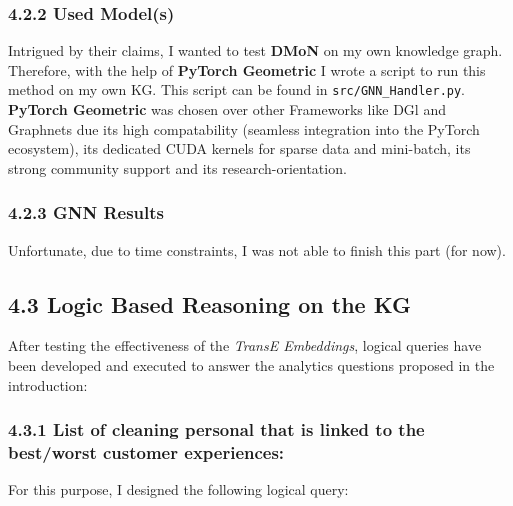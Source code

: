 \documentclass[
]{article}
\begin{document}
\subsubsection{4.2.2 Used Model(s)}\label{used-models-1}

Intrigued by their claims, I wanted to test \textbf{DMoN} on my own
knowledge graph. Therefore, with the help of \textbf{PyTorch Geometric}
I wrote a script to run this method on my own KG. This script can be
found in \texttt{src/GNN\_Handler.py}. \textbf{PyTorch Geometric} was
chosen over other Frameworks like DGl and Graphnets due its high
compatability (seamless integration into the PyTorch ecosystem), its
dedicated CUDA kernels for sparse data and mini-batch, its strong
community support and its research-orientation.

\subsubsection{4.2.3 GNN Results}\label{gnn-results}

Unfortunate, due to time constraints, I was not able to finish this part
(for now).

\subsection{4.3 Logic Based Reasoning on the
KG}\label{logic-based-reasoning-on-the-kg}

After testing the effectiveness of the \emph{TransE Embeddings}, logical
queries have been developed and executed to answer the analytics
questions proposed in the introduction:

\subsubsection{4.3.1 List of cleaning personal that is linked to the
best/worst customer
experiences:}\label{list-of-cleaning-personal-that-is-linked-to-the-bestworst-customer-experiences}

For this purpose, I designed the following logical query:
\end{document}

